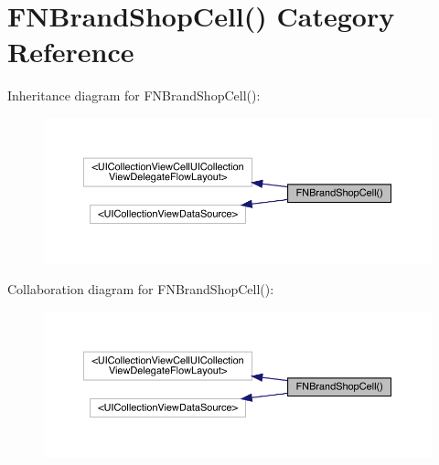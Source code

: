 \hypertarget{category_f_n_brand_shop_cell_07_08}{}\section{F\+N\+Brand\+Shop\+Cell() Category Reference}
\label{category_f_n_brand_shop_cell_07_08}


Inheritance diagram for F\+N\+Brand\+Shop\+Cell()\+:\nopagebreak
\begin{figure}[H]
\begin{center}
\leavevmode
\includegraphics[width=350pt]{category_f_n_brand_shop_cell_07_08__inherit__graph}
\end{center}
\end{figure}


Collaboration diagram for F\+N\+Brand\+Shop\+Cell()\+:\nopagebreak
\begin{figure}[H]
\begin{center}
\leavevmode
\includegraphics[width=350pt]{category_f_n_brand_shop_cell_07_08__coll__graph}
\end{center}
\end{figure}
